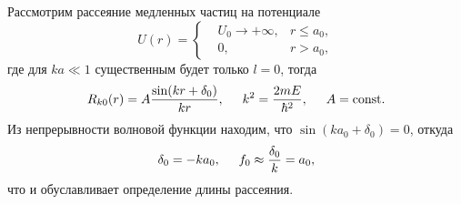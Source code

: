 
Рассмотрим рассеяние медленных частиц на потенциале
\begin{equation*}
	U(r) = \left\{\begin{aligned}
	    &U_0 \to + \infty, & r \leq a_0, \\
	    &0, &r > a_0,
	\end{aligned}\right.
\end{equation*}
где для $ka\ll 1$ существенным будет только $l=0$, тогда
\begin{equation*}
	R_{k0} (r) = A \frac{\sin (kr + \delta_0)}{kr},
	\hspace{5 mm} 
	k^2 = \frac{2 m E}{\hbar^2},
	\hspace{5 mm} 
	A = \textnormal{const}.
\end{equation*}
Из непрерывности волновой функции находим, что $\sin(k a_0 + \delta_0) = 0$, откуда
\begin{equation*}
	\delta_0 = - ka_0,
	\hspace{5 mm} 
	f_0 \approx \frac{\delta_0}{k} = a_0,
\end{equation*}
что и обуславливает определение длины рассеяния. 


